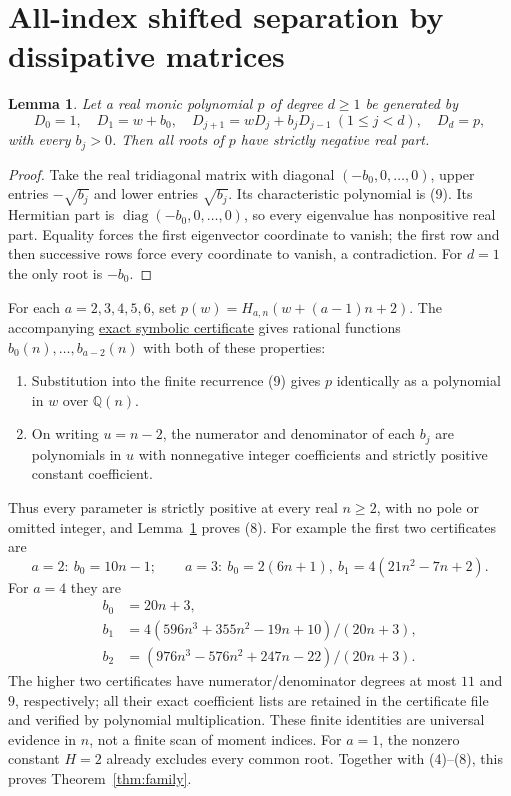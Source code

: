 \documentclass[11pt]{article}
\newtheorem{lemma}[theorem]{Lemma}
\begin{document}
\section{All-index shifted separation by dissipative matrices}
\begin{lemma}\label{lem:schwarz}
Let a real monic polynomial $p$ of degree $d\ge1$ be generated by
\[
 D_0=1,\quad D_1=w+b_0,\quad
 D_{j+1}=wD_j+b_jD_{j-1}\ (1\le j<d),\quad D_d=p,
                                                               \tag{9}
\]
with every $b_j>0$. Then all roots of $p$ have strictly negative real part.
\end{lemma}
\begin{proof}
Take the real tridiagonal matrix with diagonal $(-b_0,0,\ldots,0)$,
upper entries $-\sqrt{b_j}$ and lower entries $\sqrt{b_j}$.
Its characteristic polynomial is (9). Its Hermitian part is
$\operatorname{diag}(-b_0,0,\ldots,0)$, so every eigenvalue has nonpositive
real part. Equality forces the first eigenvector coordinate to vanish;
the first row and then successive rows force every coordinate to vanish,
a contradiction. For $d=1$ the only root is $-b_0$.
\end{proof}

For each $a=2,3,4,5,6$, set $p(w)=H_{a,n}(w+(a-1)n+2)$.
The accompanying \href{pade_shift_positive_certificates.json}{exact symbolic
certificate} gives rational functions $b_0(n),\ldots,b_{a-2}(n)$ with
both of these properties:
\begin{enumerate}
\item Substitution into the finite recurrence (9) gives $p$ identically
      as a polynomial in $w$ over $\mathbb Q(n)$.
\item On writing $u=n-2$, the numerator and denominator of each $b_j$
      are polynomials in $u$ with nonnegative integer coefficients and
      strictly positive constant coefficient.
\end{enumerate}
Thus every parameter is strictly positive at every real $n\ge2$, with
no pole or omitted integer, and Lemma~\ref{lem:schwarz} proves (8).
For example the first two certificates are
\[
 a=2:\ b_0=10n-1;\qquad
 a=3:\ b_0=2(6n+1),\ b_1=4(21n^2-7n+2).
\]
For $a=4$ they are
\[
 \begin{split}
 b_0&=20n+3,\\
 b_1&=4(596n^3+355n^2-19n+10)/(20n+3),\\
 b_2&=(976n^3-576n^2+247n-22)/(20n+3).
 \end{split}
\]
The higher two certificates have numerator/denominator degrees at most
$11$ and $9$, respectively; all their exact coefficient lists are retained
in the certificate file and verified by polynomial multiplication.
These finite identities are universal evidence in $n$, not a finite scan
of moment indices.
For $a=1$, the nonzero constant $H=2$ already excludes every common root.
Together with (4)--(8), this proves Theorem~\ref{thm:family}.
\end{document}
